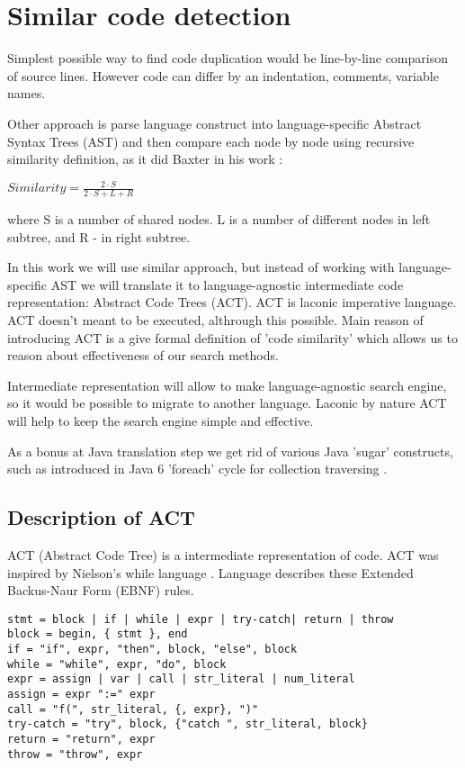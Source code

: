 \section{Similar code detection}

Simplest possible way to find code duplication would be line-by-line comparison of source lines.
However code can differ by an indentation, comments, variable names. 

Other approach is parse language construct into language-specific Abstract 
Syntax Trees (AST) and then compare each node by node using recursive similarity
definition, as it did Baxter in his work \cite{Baxter&al1998}:

\begin{math}
Similarity =  \frac{ 2 \cdot S}{2 \cdot S + L + R}
\end{math}

where S is a number of shared nodes. L is a number of different nodes in left subtree,
and R - in right subtree.

In this work we will use similar approach, but instead of working with language-specific AST we will translate it to
language-agnostic intermediate code representation: Abstract Code Trees (ACT).
ACT is laconic imperative language.
ACT doesn't meant to be executed, althrough this possible.
Main reason of introducing ACT is a give formal definition of 'code similarity' which allows us to reason about
effectiveness of our search methods.

Intermediate representation will allow to make language-agnostic search engine, so it would be possible to migrate to
another language.
Laconic by nature ACT will help to keep the search engine simple and effective. 

As a bonus at Java translation step we get rid of various Java 'sugar' constructs,
such as introduced in Java 6 'foreach' cycle for collection traversing \cite{gosling05}.

\subsection{Description of ACT}

ACT (Abstract Code Tree) is a intermediate representation of code.
ACT was inspired by Nielson's while language \cite{Nielson&Nielson93}.
Language describes these Extended Backus-Naur Form (EBNF)\cite{ISO1996} rules. 


\begin{verbatim}
stmt = block | if | while | expr | try-catch| return | throw
block = begin, { stmt }, end
if = "if", expr, "then", block, "else", block
while = "while", expr, "do", block
expr = assign | var | call | str_literal | num_literal
assign = expr ":=" expr
call = "f(", str_literal, {, expr}, ")"
try-catch = "try", block, {"catch ", str_literal, block}
return = "return", expr
throw = "throw", expr
\end{verbatim}

